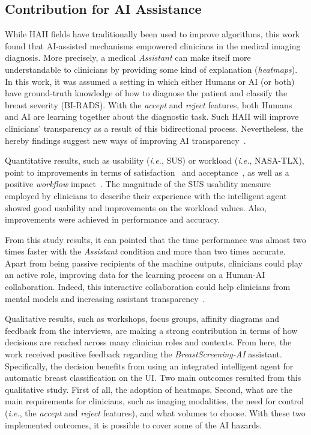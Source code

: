 \subsection{Contribution for AI Assistance}
\label{sec:sec005007002}

While \ac{HAII} fields have traditionally been used to improve algorithms, this work found that \ac{AI}-assisted mechanisms empowered clinicians in the medical imaging diagnosis.
More precisely, a medical {\it Assistant} can make itself more understandable to clinicians by providing some kind of explanation ({\it heatmaps}).
In this work, it was assumed a setting in which either Humans or \ac{AI} (or both) have ground-truth knowledge of how to diagnose the patient and classify the breast severity (\ac{BI-RADS}).
With the {\it accept} and {\it reject} features, both Humans and \ac{AI} are learning together about the diagnostic task.
Such \ac{HAII} will improve clinicians' transparency as a result of this bidirectional process.
Nevertheless, the hereby findings suggest new ways of improving \ac{AI} transparency~\cite{Cai:2019:EEE:3301275.3302289}.

Quantitative results, such as usability ({\it i.e.}, \ac{SUS}) or workload ({\it i.e.}, \ac{NASA-TLX}), point to improvements in terms of satisfaction~\cite{Bonham:2019:ARS:3308557.3308726} and acceptance~\cite{Sonntag:2012:RMD:2166966.2167031, Gambino:2019:DDR:3290607.3312916}, as well as a positive {\it workflow} impact~\cite{DeBackere:2015:DPR:2826165.2826229}.
The magnitude of the \ac{SUS} usability measure employed by clinicians to describe their experience with the intelligent agent showed good usability and improvements on the workload values.
Also, improvements were achieved in performance and accuracy.

From this study results, it can pointed that the time performance was almost two times faster with the {\it Assistant} condition and more than two times accurate.
Apart from being passive recipients of the machine outputs, clinicians could play an active role, improving data for the learning process on a Human-\ac{AI} collaboration.
Indeed, this interactive collaboration could help clinicians from mental models and increasing assistant transparency~\cite{amershi2014power, Cai:2019:HTC:3290605.3300234, Eslami:2016:FIL:2858036.2858494}.

Qualitative results, such as workshops, focus groups, affinity diagrams and feedback from the interviews, are making a strong contribution in terms of how decisions are rea\-ched across many clinician roles and contexts.
From here, the work received positive feedback regarding the {\it BreastScreening-AI} assistant.
Specifically, the decision benefits from using an integrated intelligent agent for automatic breast classification on the \ac{UI}.
Two main outcomes resulted from this qualitative study.
First of all, the adoption of heatmaps.
Second, what are the main requirements for clinicians, such as imaging modalities, the need for control ({\it i.e.}, the {\it accept} and {\it reject} features), and what volumes to choose.
With these two implemented outcomes, it is possible to cover some of the \ac{AI} hazards.

